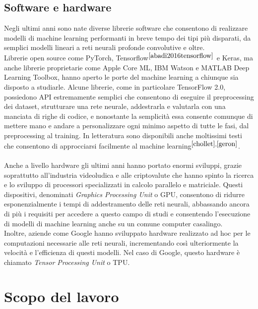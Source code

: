 \subsection{Software e hardware}
Negli ultimi anni sono nate diverse librerie software che consentono di realizzare modelli di machine learning performanti in breve tempo dei tipi più disparati, da semplici modelli lineari a reti neurali profonde convolutive e oltre.\\
Librerie open source come PyTorch, Tensorflow$^{\cite{abadi2016tensorflow}}$ e Keras, ma anche librerie proprietarie come Apple Core ML, IBM Watson e MATLAB Deep Learning Toolbox, hanno aperto le porte del machine learning a chiunque sia disposto a studiarle. Alcune librerie, come in particolare TensorFlow 2.0, possiedono API estremamente semplici che consentono di eseguire il preprocessing dei dataset, strutturare una rete neurale, addestrarla e valutarla con una manciata di righe di codice, e nonostante la semplicità essa consente comunque di mettere mano e andare a personalizzare ogni minimo aspetto di tutte le fasi, dal preprocessing al training. In letteratura sono disponibili anche moltissimi testi che consentono di approcciarsi facilmente al machine learning$^{\cite{chollet},\cite{geron}}$.\\\\
Anche a livello hardware gli ultimi anni hanno portato enormi sviluppi, grazie soprattutto all'industria videoludica e alle criptovalute che hanno spinto la ricerca e lo sviluppo di processori specializzati in calcolo parallelo e matriciale. Questi dispositivi, denominati \textit{Graphics Processing Unit} o GPU, consentono di ridurre esponenzialmente i tempi di addestramento delle reti neurali, abbassando ancora di più i requisiti per accedere a questo campo di studi e consentendo l'esecuzione di modelli di machine learning anche su un comune computer casalingo.\\
Inoltre, aziende come Google hanno sviluppato hardware realizzato ad hoc per le computazioni necessarie alle reti neurali, incrementando così ulteriormente la velocità e l'efficienza di questi modelli. Nel caso di Google, questo hardware è chiamato \textit{Tensor Processing Unit} o TPU.

\section{Scopo del lavoro}  %
